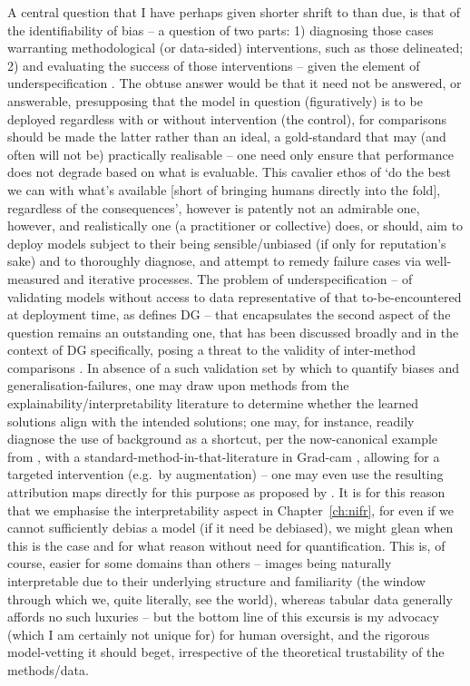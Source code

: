 %
A central question that I have perhaps given shorter shrift to than due, is that of the
identifiability of bias -- a question of two parts: 1) diagnosing those cases warranting
methodological (or data-sided) interventions, such as those delineated; 2) and evaluating the
success of those interventions -- given the element of underspecification
\citep{semenova2019study}.
%
The obtuse answer would be that it need not be answered, or answerable, presupposing that the model
in question (figuratively) is to be deployed regardless with or without intervention (the control),
for comparisons should be made \wrt{} the latter rather than \wrt{} an ideal, a gold-standard that
may (and often will not be) practically realisable -- one need only ensure that performance does
not degrade based on what is evaluable.
%
%
This cavalier ethos of `do the best we can with what's available [short of bringing humans directly
into the fold], regardless of the consequences', however is patently not an admirable one, however,
and realistically one (a practitioner or collective) does, or should, aim to deploy models subject
to their being sensible/unbiased (if only for reputation's sake) and to thoroughly diagnose, and
attempt to remedy failure cases via well-measured and iterative processes.
%
The problem of underspecification -- of validating models without access to data representative of
that to-be-encountered at deployment time, as defines \ac{DG} -- that encapsulates the second
aspect of the question remains an outstanding one, that has been discussed broadly and in the
context of \ac{DG} specifically, posing a threat to the validity of inter-method comparisons
\citep{gulrajani2020search}.
%
%
In absence of a such validation set by which to quantify biases and generalisation-failures, one
may draw upon methods from the explainability/interpretability literature \citep{gunning2019xai} to
determine whether the learned solutions align with the intended solutions; one may, for instance,
readily diagnose the use of background as a shortcut, per the now-canonical example from
\citet{beery2018recognition}, with a standard-method-in-that-literature in Grad-cam
\citep{selvaraju2017grad}, allowing for a targeted intervention (e.g.\ by augmentation) -- one may
even use the resulting attribution maps directly for this purpose as proposed by
\citet{taghanaki2022masktune}.
%
It is for this reason that we emphasise the interpretability aspect in Chapter~\ref{ch:nifr}, for
even if we cannot sufficiently debias a model (if it need be debiased), we might glean when this is
the case and for what reason without need for quantification.
%
This is, of course, easier for some domains than others -- images being naturally interpretable due
to their underlying structure and familiarity (the window through which we, quite literally, see
the world), whereas tabular data generally affords no such luxuries -- but the bottom line of this
excursis is my advocacy (which I am certainly not unique for) for human oversight, and the rigorous
model-vetting it should beget, irrespective of the theoretical trustability of the methods/data.
 
